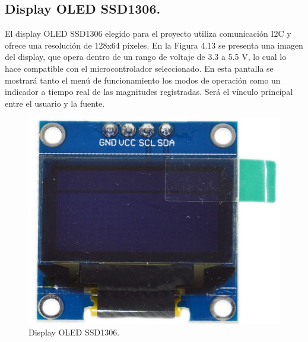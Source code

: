 \subsection{Display OLED SSD1306.}
El display OLED SSD1306 elegido para el proyecto utiliza comunicación I2C y ofrece una resolución de 128x64 píxeles. En la Figura 4.13 se presenta una imagen del display, que opera dentro de un rango de voltaje de 3.3 a 5.5 V, lo cual lo hace compatible con el microcontrolador seleccionado. En esta pantalla se mostrará tanto el menú de funcionamiento los modos de operación como un indicador a tiempo real de las magnitudes registradas. Será el vínculo principal entre el usuario y la fuente.

\begin{figure}[H]
    \centering 
    \includegraphics[scale=0.3]{./imagenes/display.jpg}
    \caption{Display OLED SSD1306.}
    \label{F:display}
\end{figure}


